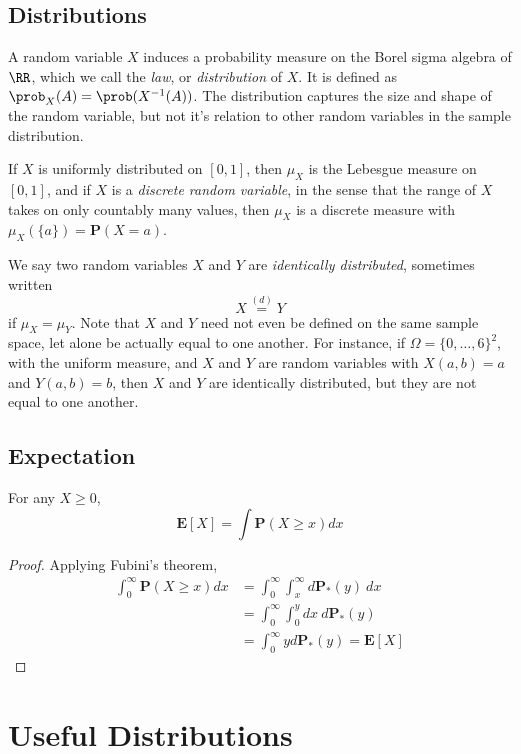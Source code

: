 \section{Distributions}

A random variable $X$ induces a probability measure on the Borel sigma algebra of $\RR$, which we call the \emph{law}, or \emph{distribution} of $X$. It is defined as $\prob_X(A) = \prob(X^{-1}(A))$. The distribution captures the size and shape of the random variable, but not it's relation to other random variables in the sample distribution.

If $X$ is uniformly distributed on $[0,1]$, then $\mu_X$ is the Lebesgue measure on $[0,1]$, and if $X$ is a {\it discrete random variable}, in the sense that the range of $X$ takes on only countably many values, then $\mu_X$ is a discrete measure with $\mu_X(\{ a \}) = \mathbf{P}(X = a)$.

We say two random variables $X$ and $Y$ are \emph{identically distributed}, sometimes written
%
\[ X \overset{(d)}{=} Y \]
%
if $\mu_X = \mu_Y$. Note that $X$ and $Y$ need not even be defined on the same sample space, let alone be actually equal to one another. For instance, if $\Omega = \{ 0, \dots, 6 \}^2$, with the uniform measure, and $X$ and $Y$ are random variables with $X(a,b) = a$ and $Y(a,b) = b$, then $X$ and $Y$ are identically distributed, but they are not equal to one another.

\section{Expectation}

\begin{theorem}
    For any $X \geq 0$,
    \[ \mathbf{E}[X] = \int \mathbf{P}(X \geq x) dx \]
\end{theorem}
\begin{proof}
    Applying Fubini's theorem,
    \begin{align*}
        \int_0^\infty \mathbf{P}(X \geq x) dx &= \int_0^\infty \int_x^\infty d \mathbf{P}_*(y)\ dx\\
        &= \int_0^\infty \int_0^y dx\ d\mathbf{P}_*(y)\\
        &= \int_0^\infty y d\mathbf{P}_*(y) = \mathbf{E}[X]
    \end{align*}
\end{proof}

\chapter{Useful Distributions}


